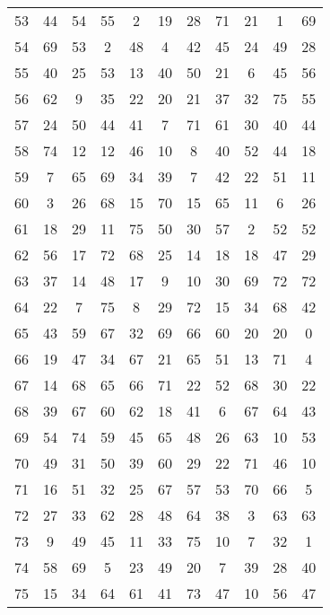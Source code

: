 \begin{table}
\begin{tabular}{c c c c c c c c c c c }
53 & 44 & 54 & 55 & 2 & 19 & 28 & 71 & 21 & 1 & 69 \\
54 & 69 & 53 & 2 & 48 & 4 & 42 & 45 & 24 & 49 & 28 \\
55 & 40 & 25 & 53 & 13 & 40 & 50 & 21 & 6 & 45 & 56 \\
56 & 62 & 9 & 35 & 22 & 20 & 21 & 37 & 32 & 75 & 55 \\
57 & 24 & 50 & 44 & 41 & 7 & 71 & 61 & 30 & 40 & 44 \\
58 & 74 & 12 & 12 & 46 & 10 & 8 & 40 & 52 & 44 & 18 \\
59 & 7 & 65 & 69 & 34 & 39 & 7 & 42 & 22 & 51 & 11 \\
60 & 3 & 26 & 68 & 15 & 70 & 15 & 65 & 11 & 6 & 26 \\
61 & 18 & 29 & 11 & 75 & 50 & 30 & 57 & 2 & 52 & 52 \\
62 & 56 & 17 & 72 & 68 & 25 & 14 & 18 & 18 & 47 & 29 \\
63 & 37 & 14 & 48 & 17 & 9 & 10 & 30 & 69 & 72 & 72 \\
64 & 22 & 7 & 75 & 8 & 29 & 72 & 15 & 34 & 68 & 42 \\
65 & 43 & 59 & 67 & 32 & 69 & 66 & 60 & 20 & 20 & 0 \\
66 & 19 & 47 & 34 & 67 & 21 & 65 & 51 & 13 & 71 & 4 \\
67 & 14 & 68 & 65 & 66 & 71 & 22 & 52 & 68 & 30 & 22 \\
68 & 39 & 67 & 60 & 62 & 18 & 41 & 6 & 67 & 64 & 43 \\
69 & 54 & 74 & 59 & 45 & 65 & 48 & 26 & 63 & 10 & 53 \\
70 & 49 & 31 & 50 & 39 & 60 & 29 & 22 & 71 & 46 & 10 \\
71 & 16 & 51 & 32 & 25 & 67 & 57 & 53 & 70 & 66 & 5 \\
72 & 27 & 33 & 62 & 28 & 48 & 64 & 38 & 3 & 63 & 63 \\
73 & 9 & 49 & 45 & 11 & 33 & 75 & 10 & 7 & 32 & 1 \\
74 & 58 & 69 & 5 & 23 & 49 & 20 & 7 & 39 & 28 & 40 \\
75 & 15 & 34 & 64 & 61 & 41 & 73 & 47 & 10 & 56 & 47 \\
\hline
\end{tabular}
\end{table}